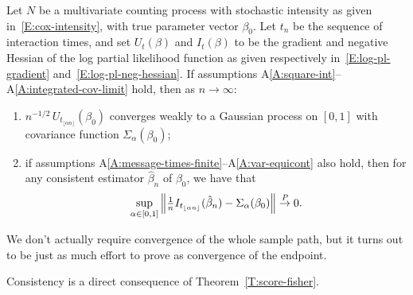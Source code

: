 \documentclass[final]{statsoc}
\begin{document}
\begin{theorem}\label{T:score-fisher}
    Let $N$ be a multivariate counting process with stochastic
    intensity as given in~\eqref{E:cox-intensity}, with true parameter
    vector $\beta_0$.  Let $t_n$ be the sequence of interaction times,
    and set $U_t(\beta)$ and $I_t(\beta)$ to
    be the gradient and negative Hessian of the log partial likelihood
    function
    as given respectively in~\eqref{E:log-pl-gradient} and~\eqref{E:log-pl-neg-hessian}.  If
    assumptions A\ref{A:square-int}--A\ref{A:integrated-cov-limit} hold, then
    as $n \to \infty$:
    \begin{enumerate}
        \item \label{I:score-part}
        $n^{-1/2} \, U_{t_{\lfloor \alpha n \rfloor}}(\beta_0)$
        converges weakly to a Gaussian process on $[0,1]$ with
        covariance function $\Sigma_\alpha(\beta_0)$;

        \item \label{I:fisher-part}
        if assumptions
        A\ref{A:message-times-finite}--A\ref{A:var-equicont} also hold, then for any consistent
        estimator $\hat \beta_n$ of $\beta_0$,
        we have that
        \[
            \sup_{\alpha \in [0,1]}
            \left\|
                \tfrac{1}{n}
                I_{t_{\lfloor \alpha n \rfloor}}(\hat \beta_{n})
                -
                \Sigma_\alpha(\beta_0)
            \right\|
            \overset{\mathit{P}}{\to}
            0.
        \]
    \end{enumerate}
\end{theorem}

We don't actually require convergence of the whole sample path, but
it turns out to be just as much effort to prove as convergence of the
endpoint.

Consistency is a direct consequence of Theorem~\ref{T:score-fisher}.
\end{document}
